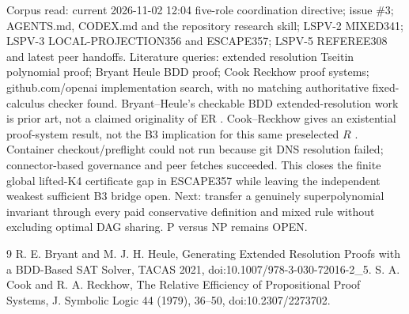 \documentclass[11pt]{article}
\begin{document}
Corpus read: current 2026-11-02 12:04 five-role coordination directive; issue \#3; AGENTS.md, CODEX.md and the repository research skill; LSPV-2 MIXED341; LSPV-3 LOCAL-PROJECTION356 and ESCAPE357; LSPV-5 REFEREE308 and latest peer handoffs. Literature queries: extended resolution Tseitin polynomial proof; Bryant Heule BDD proof; Cook Reckhow proof systems; github.com/openai implementation search, with no matching authoritative fixed-calculus checker found. Bryant--Heule's checkable BDD extended-resolution work is prior art, not a claimed originality of ER \cite{BH}. Cook--Reckhow gives an existential proof-system result, not the B3 implication for this same preselected $R$ \cite{CR}. Container checkout/preflight could not run because git DNS resolution failed; connector-based governance and peer fetches succeeded. This closes the finite global lifted-K4 certificate gap in ESCAPE357 while leaving the independent weakest sufficient B3 bridge open. Next: transfer a genuinely superpolynomial invariant through every paid conservative definition and mixed rule without excluding optimal DAG sharing. P versus NP remains OPEN.

\begin{thebibliography}{9}
 R. E. Bryant and M. J. H. Heule, Generating Extended Resolution Proofs with a BDD-Based SAT Solver, TACAS 2021, doi:10.1007/978-3-030-72016-2\_5.
 S. A. Cook and R. A. Reckhow, The Relative Efficiency of Propositional Proof Systems, J. Symbolic Logic 44 (1979), 36--50, doi:10.2307/2273702.
\end{thebibliography}
\end{document}
